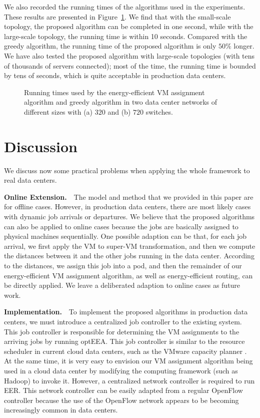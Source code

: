 \documentclass[journal,single-space,two column,twoside,10pt]{IEEEtran}
\begin{document}
We also recorded the running times of the algorithms used in the experiments. These results are presented in Figure~\ref{fig:time}. We find that with the small-scale topology, the proposed algorithm can be completed in one second, while with the large-scale topology, the running time is within 10 seconds. Compared with the greedy algorithm, the running time of the proposed algorithm is only $50\%$ longer. We have also tested the proposed algorithm with large-scale topologies (with tens of thousands of servers connected); most of the time, the running time is bounded by tens of seconds, which is quite acceptable in production data centers.

\begin{figure}[!t]
	\centering
	\hspace{-0.3in}
	\caption{\label{fig:time}Running times used by the energy-efficient VM assignment algorithm and greedy algorithm in two data center networks of different sizes with (a) $320$ and (b) $720$ switches.}
\end{figure} 


\section{Discussion}
\label{sec:discussion}

We discuss now some practical problems when applying the whole framework to real data centers.

\textbf{Online Extension.}~~The model and method that we provided in this paper are for offline cases. However, in production data centers, there are most likely cases with dynamic job arrivals or departures. We believe that the proposed algorithms can also be applied to online cases because the jobs are basically assigned to physical machines sequentially. One possible adaption can be that, for each job arrival, we first apply the VM to super-VM transformation, and then we compute the distances between it and the other jobs running in the data center. According to the distances, we assign this job into a pod, and then the remainder of our energy-efficient VM assignment algorithm, as well as energy-efficient routing, can be directly applied. We leave a deliberated adaption to online cases as future work.

\textbf{Implementation.}~~To implement the proposed algorithms in production data centers, we must introduce a centralized job controller to the existing system. This job controller is responsible for determining the VM assignments to the arriving jobs by running optEEA. This job controller is similar to the resource scheduler in current cloud data centers, such as the VMware capacity planner \cite{VCP}. At the same time, it is very easy to envision our VM assignment algorithm being used in a cloud data center by modifying the computing framework (such as Hadoop) to invoke it. However, a centralized network controller is required to run EER. This network controller can be easily adapted from a regular OpenFlow controller because the use of the OpenFlow network appears to be becoming increasingly common in data centers.
\end{document}
